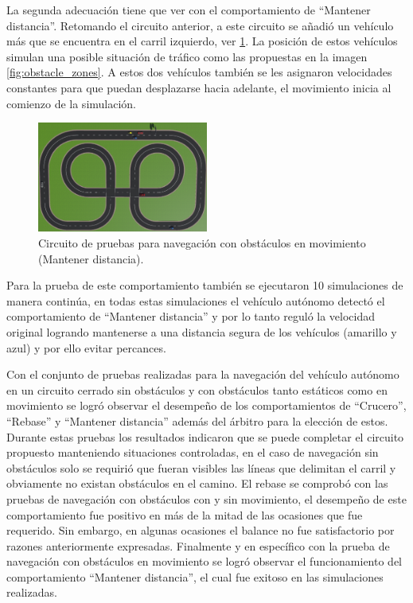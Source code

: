 La segunda adecuación tiene que ver con el comportamiento de ``Mantener distancia''. Retomando el circuito anterior, a este circuito se añadió un vehículo más que se encuentra en el carril izquierdo, ver \ref{fig:navigation_keep_distance}. La posición de estos vehículos simulan una posible situación de tráfico como las propuestas en la imagen \ref{fig:obstacle_zones}. A estos dos vehículos también se les asignaron velocidades constantes para que puedan desplazarse hacia adelante, el movimiento inicia al comienzo de la simulación.
\begin{figure}[h]
    \centering
    \includegraphics[width=0.5\textwidth]{Figures/Figures_Cap07/navigation_keep_distance.png}
    \caption{Circuito de pruebas para navegación con obstáculos en movimiento (Mantener distancia).}
    \label{fig:navigation_keep_distance}
\end{figure}

Para la prueba de este comportamiento también se ejecutaron 10 simulaciones de manera continúa, en todas estas simulaciones el vehículo autónomo detectó el comportamiento de ``Mantener distancia'' y por lo tanto reguló la velocidad original logrando mantenerse a una distancia segura de los vehículos (amarillo y azul) y por ello evitar percances. 

Con el conjunto de pruebas realizadas para la navegación del vehículo autónomo en un circuito cerrado sin obstáculos y con obstáculos tanto estáticos como en movimiento se logró observar el desempeño de los comportamientos de ``Crucero'', ``Rebase'' y ``Mantener distancia'' además del árbitro para la elección de estos. Durante estas pruebas los resultados indicaron que se puede completar el circuito propuesto manteniendo situaciones controladas, en el caso de navegación sin obstáculos solo se requirió que fueran visibles las líneas que delimitan el carril y obviamente no existan obstáculos en el camino. El rebase se comprobó con las pruebas de navegación con obstáculos con y sin movimiento, el desempeño de este comportamiento fue positivo en más de la mitad de las ocasiones que fue requerido. Sin embargo, en algunas ocasiones el balance no fue satisfactorio por razones anteriormente expresadas. Finalmente y en específico con la prueba de navegación con obstáculos en movimiento se logró observar el funcionamiento del comportamiento ``Mantener distancia'', el cual fue exitoso en las simulaciones realizadas. 

